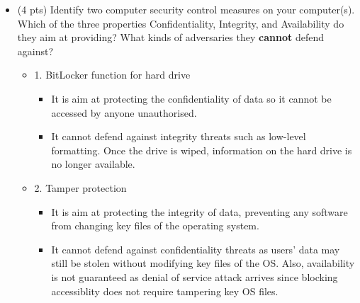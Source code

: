\documentclass[11pt]{article}
\begin{document}
\begin{description}
\begin{itemize}
\begin{itemize}
\begin{itemize}
			\end{itemize}
	\end{itemize}
 \item (4 pts)
Identify two computer security control measures on your computer(s).  Which of the
three properties Confidentiality, Integrity, and Availability do they aim at
providing? What kinds of adversaries they \textbf{cannot} defend against?
	\begin{itemize}
		\item
		1. BitLocker function for hard drive
		\begin{itemize}
			\item
			It is aim at protecting the confidentiality of data so it cannot be accessed by anyone unauthorised.
			\item
			It cannot defend against integrity threats such as low-level formatting. Once the drive is wiped, information on the hard drive is no longer available.
		\end{itemize}
		\item
		2. Tamper protection
		\begin{itemize}
			\item
			It is aim at protecting the integrity of data, preventing any software from changing key files of the operating system.
			\item
			It cannot defend against confidentiality threats as users' data may still be stolen without modifying key files of the OS. Also, availability is not guaranteed as denial of service attack arrives since blocking accessiblity does not require tampering key OS files.
		\end{itemize}
	\end{itemize}

\end{itemize}



\end{description}
\end{document}
